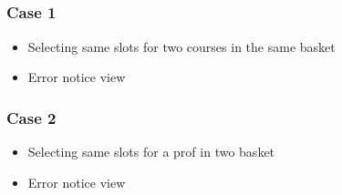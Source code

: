 \documentclass[letterpaper,10pt,english]{sphinxmanual}
\begin{document}


\subsection{}
\label{\detokenize{user_manual:id2}}

\subsubsection{Case 1}
\label{\detokenize{user_manual:id3}}\begin{itemize}
\item {} 
Selecting same slots for two courses in the same basket

\end{itemize}

\begin{itemize}
\item {} 
Error notice view

\end{itemize}



\subsubsection{Case 2}
\label{\detokenize{user_manual:id4}}\begin{itemize}
\item {} 
Selecting same slots for a prof in two basket

\end{itemize}

\begin{itemize}
\item {} 
Error notice view

\end{itemize}
\end{document}

